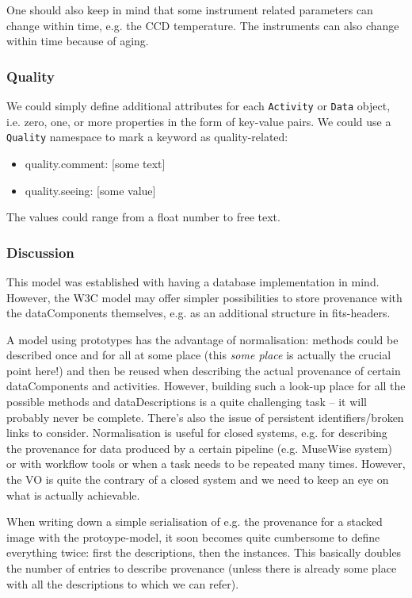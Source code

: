 \documentclass[11pt,a4paper]{ivoa}
\begin{document}
One should also keep in mind that some instrument related parameters can change within time,
e.g. the CCD temperature. The instruments can also change within time because of aging.


\subsubsection{Quality}
We could simply define additional attributes for each \texttt{Activity}
or \texttt{Data} object, i.e. zero, one, or more properties in the form of
key-value pairs. We could use a \texttt{Quality} namespace to mark a keyword
as quality-related:
\begin{itemize}
	\item quality.comment: [some text]
	\item quality.seeing: [some value]
\end{itemize}
The values could range from a float number to free text.

\subsubsection{Discussion}
This model was established with having a database implementation in mind. However, the W3C model may offer simpler possibilities to store provenance with the dataComponents themselves, e.g. as an additional structure in fits-headers.

A model using prototypes has the advantage of normalisation: methods could be described once and for all at some place (this \emph{some place} is actually the crucial point here!) and then be reused when describing the actual provenance of certain dataComponents and activities.
However, building such a look-up place for all the possible methods and dataDescriptions is a quite challenging task -- it will probably never be complete. There's also the issue of persistent identifiers/broken links to consider.
Normalisation is useful for closed systems, e.g. for describing the provenance for data produced by a certain pipeline (e.g. MuseWise system) or with workflow tools or when a task needs to be repeated many times. However, the VO is quite the contrary of a closed system and we need to keep an eye on what is actually achievable.

When writing down a simple serialisation of e.g. the provenance for a stacked image with the protoype-model, it soon becomes quite cumbersome to define everything twice: first the descriptions, then the instances. This basically doubles the number of entries to describe provenance (unless there is already some place with all the descriptions to which we can refer).
\end{document}
